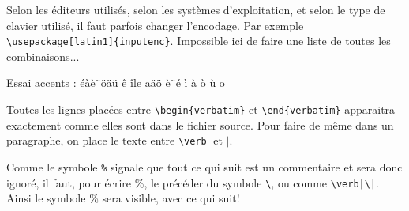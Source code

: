 \documentclass[a4paper,12pt,twoside]{article}
\begin{document}
Selon les \'editeurs utilis\'es, selon les syst\`emes d'exploitation, et selon le type de clavier utilisé, il faut parfois changer l'encodage. Par exemple \verb+\usepackage[latin1]{inputenc}+. Impossible ici de faire une liste de toutes les combinaisons...

Essai accents :   éàè¨öäü ê île aäö è¨é   ì à ò ù o


Toutes les lignes  plac\'ees entre \verb|\begin{verbatim}| et 
\verb|\end{verbatim}|  apparaitra exactement comme elles 
sont dans le fichier source. Pour faire de m\^eme dans un paragraphe, 
on place le texte entre \verb|\verb|$|$ et  $|$.

Comme le symbole \verb|%| signale que tout ce qui suit est un commentaire et sera donc ignor\'e, il faut, pour \'ecrire \%, le pr\'ec\'eder du symbole \verb|\|, ou comme \verb+\verb|\|+. 
Ainsi le symbole \% sera visible, avec ce qui suit!



 
 
 
\end{document}
